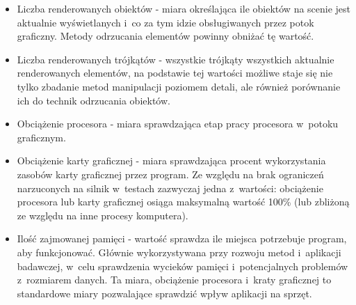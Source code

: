 \documentclass[a4paper,twoside,12pt]{book}
\begin{document}
\begin{itemize}
    \item Liczba renderowanych obiektów - miara określająca ile obiektów na scenie jest aktualnie wyświetlanych i~co za tym idzie obsługiwanych przez potok graficzny. Metody odrzucania elementów powinny obniżać tę wartość.
    \item Liczba renderowanych trójkątów - wszystkie trójkąty wszystkich aktualnie renderowanych elementów, na podstawie tej wartości możliwe staje się nie tylko zbadanie metod manipulacji poziomem detali, ale również porównanie ich do technik odrzucania obiektów.
    \item Obciążenie procesora - miara sprawdzająca etap pracy procesora w~potoku graficznym.
    \item Obciążenie karty graficznej - miara sprawdzająca procent wykorzystania zasobów karty graficznej przez program. Ze względu na brak ograniczeń narzuconych na silnik w~testach zazwyczaj jedna z~wartości: obciążenie procesora lub karty graficznej osiąga maksymalną wartość 100\% (lub zbliżoną ze względu na inne procesy komputera).
    \item Ilość zajmowanej pamięci - wartość sprawdza ile miejsca potrzebuje program, aby funkcjonować. Głównie wykorzystywana przy rozwoju metod i~aplikacji badawczej, w~celu sprawdzenia wycieków pamięci i~potencjalnych problemów z~rozmiarem danych. Ta miara, obciążenie procesora i~kraty graficznej to standardowe miary pozwalające sprawdzić wpływ aplikacji na sprzęt.
\end{itemize}

\vbox{}
\end{document}
